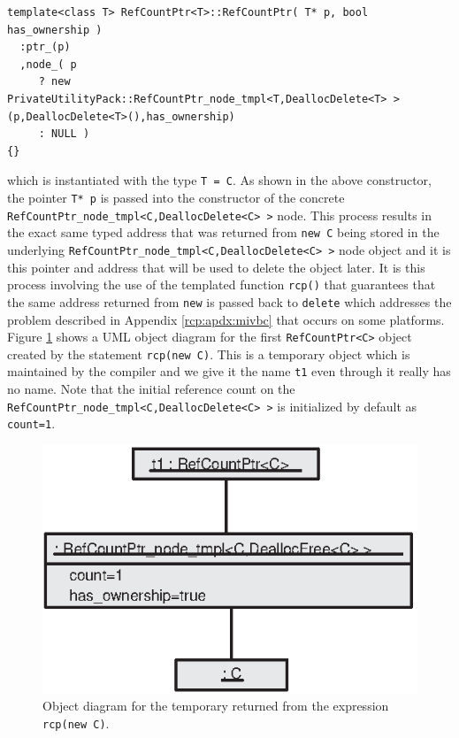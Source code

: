 {\scriptsize\begin{verbatim}
template<class T> RefCountPtr<T>::RefCountPtr( T* p, bool has_ownership )
  :ptr_(p)
  ,node_( p
     ? new PrivateUtilityPack::RefCountPtr_node_tmpl<T,DeallocDelete<T> >(p,DeallocDelete<T>(),has_ownership)
     : NULL )
{}
\end{verbatim}}

{}\noindent{}which is instantiated with the type {}\texttt{T = C}.  As
shown in the above constructor, the pointer {}\texttt{T* p} is passed
into the constructor of the concrete
{}\texttt{Ref\-Count\-Ptr\-\_node\-\_tmpl<\-C\-,Dealloc\-Delete<C> >}
node.  This process results in the exact same typed address that was
returned from {}\texttt{new C} being stored in the underlying
{}\texttt{Ref\-Count\-Ptr\-\_node\-\_tmpl<\-C\-,Dealloc\-Delete<C> >}
node object and it is this pointer and address that will be used to
delete the object later.  It is this process involving the use of the
templated function {}\texttt{rcp()} that guarantees that the same
address returned from {}\texttt{new} is passed back to
{}\texttt{delete} which addresses the problem described in Appendix
{}\ref{rcp:apdx:mivbc} that occurs on some platforms.  Figure
{}\ref{rcp:fig:rcp-object-diagram_m_1} shows a UML object diagram for
the first {}\texttt{Ref\-Count\-Ptr<C>} object created by the
statement {}\texttt{rcp(new C)}.  This is a temporary object which is
maintained by the compiler and we give it the name {}\texttt{t1} even
through it really has no name.  Note that the initial reference count
on the
{}\texttt{Ref\-Count\-Ptr\-\_node\-\_tmpl<\-C,\-Dealloc\-Delete<C> >}
is initialized by default as {}\texttt{count=1}.

{\bsinglespace
\begin{figure}
\begin{center}
\includegraphics*[bb= 0.0in 0.0in 2.6in 1.8in,scale=1.0
]{RefCountPtrObjectDiagram_1}
\end{center}
{}\caption{ {}\label{rcp:fig:rcp-object-diagram_m_1} Object diagram
for the temporary returned from the expression {}\texttt{rcp(new
C)}. }
\end{figure}
\esinglespace}

